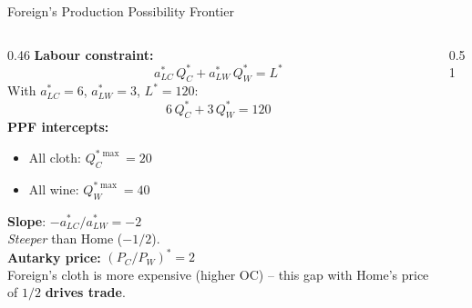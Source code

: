 \documentclass[aspectratio=169]{beamer}
\begin{document}
\begin{frame}[shrink=15]{Foreign's Production Possibility Frontier}
\begin{columns}[T]
\begin{column}{0.46\textwidth}
\textbf{Labour constraint:}
\[a_{LC}^{*}\,Q_C^{*}+a_{LW}^{*}\,Q_W^{*}=L^{*}\]
With $a_{LC}^{*}=6$, $a_{LW}^{*}=3$, $L^{*}=120$:
\[6\,Q_C^{*}+3\,Q_W^{*}=120\]
\textbf{PPF intercepts:}
\begin{itemize}\small
  \item All cloth: $Q_C^{*\max}=20$
  \item All wine: $Q_W^{*\max}=40$
\end{itemize}
\textbf{Slope}: $-a_{LC}^{*}/a_{LW}^{*}=-2$\\[0.2em]
\emph{Steeper} than Home ($-1/2$).\\[0.3em]
\textbf{Autarky price:} $(P_C/P_W)^{*}=2$\\[0.2em]
Foreign's cloth is more expensive (higher OC) --
this gap with Home's price of $1/2$ \textbf{drives trade}.
\end{column}
\begin{column}{0.51\textwidth}

\end{column}
\end{columns}
\end{frame}
\end{document}
